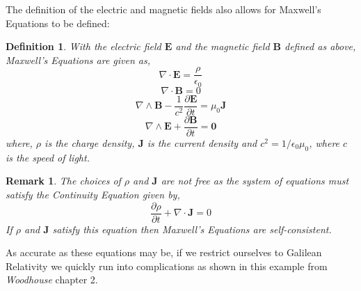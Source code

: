 \documentclass[a4paper,12pt,draft]{report}
\newtheorem{remark}{Remark}
\newtheorem{definition}{Definition}
\begin{document}
The definition of the electric and magnetic fields also allows for Maxwell's Equations to be defined:

\begin{definition}
With the electric field $\mathbf{E}$ and the magnetic field $\mathbf{B}$ defined as above, Maxwell's Equations are given as,
\begin{equation}
\nabla\cdot\mathbf{E} = \frac{\rho}{\epsilon_0} \label{ME1}
\end{equation}
\begin{equation}
\nabla\cdot\mathbf{B} = 0 \label{ME2}
\end{equation}
\begin{equation}
\nabla\wedge\mathbf{B} - \frac{1}{c^2}\frac{\partial\mathbf{E}}{\partial t} = \mu_0\mathbf{J} \label{ME3}
\end{equation}
\begin{equation}
\nabla\wedge\mathbf{E} + \frac{\partial\mathbf{B}}{\partial t} = \mathbf{0} \label{ME4}
\end{equation}
where, $\rho$ is the charge density, $\mathbf{J}$ is the current density and $c^2 = 1/\epsilon_0\mu_0$, where $c$ is the speed of light.
\end{definition}

\begin{remark}
The choices of $\rho$ and $\mathbf{J}$ are not free as the system of equations must satisfy the Continuity Equation given by,
$$
\frac{\partial\rho}{\partial t} + \nabla\cdot\mathbf{J} = 0
$$
If $\rho$ and $\mathbf{J}$ satisfy this equation then Maxwell's Equations are self-consistent.
\end{remark}

As accurate as these equations may be, if we restrict ourselves to Galilean Relativity we quickly run into complications as shown in this example from \emph{Woodhouse} \cite{NMJW} chapter 2.
\end{document}
